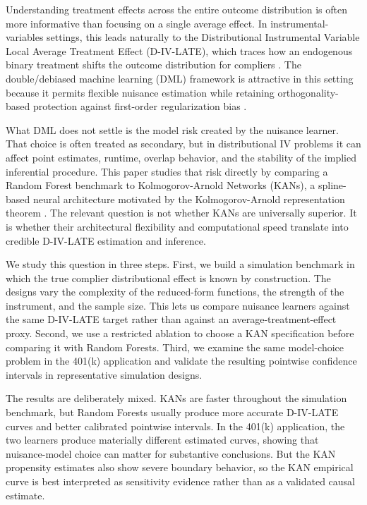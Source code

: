 \documentclass[final,3p,fleqn, 10pt]{elsarticle}
\begin{document}
Understanding treatment effects across the entire outcome distribution is often more informative than focusing on a single average effect. In instrumental-variables settings, this leads naturally to the Distributional Instrumental Variable Local Average Treatment Effect (D-IV-LATE), which traces how an endogenous binary treatment shifts the outcome distribution for compliers \citep{imbens1997estimating, abadie2002bootstrap}. The double/debiased machine learning (DML) framework is attractive in this setting because it permits flexible nuisance estimation while retaining orthogonality-based protection against first-order regularization bias \citep{chernozhukov2018debiased}.

What DML does not settle is the model risk created by the nuisance learner. That choice is often treated as secondary, but in distributional IV problems it can affect point estimates, runtime, overlap behavior, and the stability of the implied inferential procedure. This paper studies that risk directly by comparing a Random Forest benchmark to Kolmogorov-Arnold Networks (KANs), a spline-based neural architecture motivated by the Kolmogorov-Arnold representation theorem \citep{liu2024kan, kratsios2025kolmogorov}. The relevant question is not whether KANs are universally superior. It is whether their architectural flexibility and computational speed translate into credible D-IV-LATE estimation and inference.

We study this question in three steps. First, we build a simulation benchmark in which the true complier distributional effect is known by construction. The designs vary the complexity of the reduced-form functions, the strength of the instrument, and the sample size. This lets us compare nuisance learners against the same D-IV-LATE target rather than against an average-treatment-effect proxy. Second, we use a restricted ablation to choose a KAN specification before comparing it with Random Forests. Third, we examine the same model-choice problem in the 401(k) application and validate the resulting pointwise confidence intervals in representative simulation designs.

The results are deliberately mixed. KANs are faster throughout the simulation benchmark, but Random Forests usually produce more accurate D-IV-LATE curves and better calibrated pointwise intervals. In the 401(k) application, the two learners produce materially different estimated curves, showing that nuisance-model choice can matter for substantive conclusions. But the KAN propensity estimates also show severe boundary behavior, so the KAN empirical curve is best interpreted as sensitivity evidence rather than as a validated causal estimate.
\end{document}
